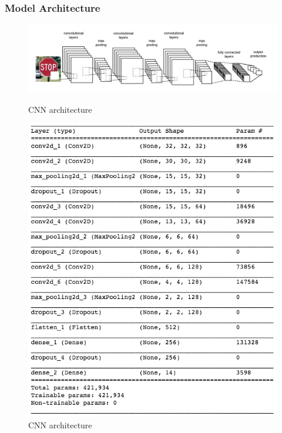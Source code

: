 \documentclass{article}
\begin{document}
\subsubsection{Model Architecture}
\begin{figure}
  \centering
  \begin{minipage}{1.0\textwidth}
    \centering
    \includegraphics[width=1.0\linewidth]{conv.png}
    \caption{CNN architecture}
    \label{fig:fig_4}
  \end{minipage}
  \centering
  \begin{minipage}{0.6\textwidth}
    \centering
    \includegraphics[width=1.0\linewidth]{archi_param.png}
    \caption{CNN architecture}
    \label{fig:fig_5}
  \end{minipage}
\end{figure}
\end{document}
